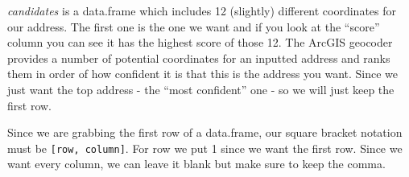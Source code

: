 \documentclass[
  12pt,
  openany]{book}
\newenvironment{Shaded}{\begin{snugshade}}{\end{snugshade}}
\newcommand{\CommentTok}[1]{\textcolor[rgb]{0.37,0.37,0.37}{\textit{#1}}}
\newcommand{\FunctionTok}[1]{\textcolor[rgb]{0,0,0}{#1}}
\newcommand{\NormalTok}[1]{#1}
\newcommand{\OtherTok}[1]{\textcolor[rgb]{0.37,0.37,0.37}{#1}}
\newcommand{\SpecialCharTok}[1]{\textcolor[rgb]{0,0,0}{#1}}
\newcommand{\StringTok}[1]{\textcolor[rgb]{0.5,0.5,0.5}{#1}}
\begin{document}
\begin{Shaded}
\end{Shaded}

\emph{candidates} is a data.frame which includes 12 (slightly) different coordinates for our address. The first one is the one we want and if you look at the ``score'' column you can see it has the highest score of those 12. The ArcGIS geocoder provides a number of potential coordinates for an inputted address and ranks them in order of how confident it is that this is the address you want. Since we just want the top address - the ``most confident'' one - so we will just keep the first row.

Since we are grabbing the first row of a data.frame, our square bracket notation must be \texttt{{[}row,\ column{]}}. For row we put 1 since we want the first row. Since we want every column, we can leave it blank but make sure to keep the comma.
\end{document}
